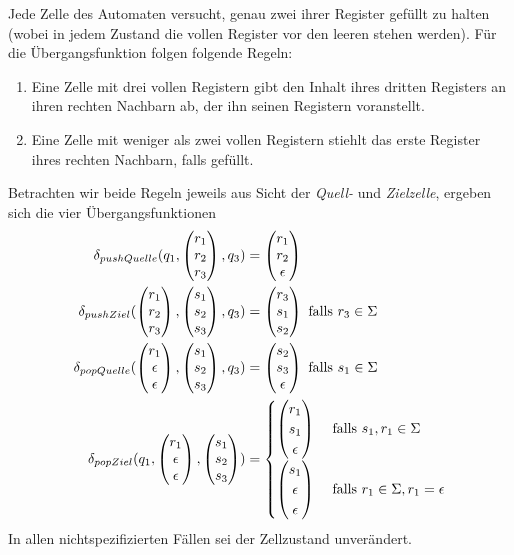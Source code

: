 \documentclass{article}
\begin{document}
Jede Zelle des Automaten versucht, genau zwei ihrer Register gefüllt zu halten (wobei in jedem Zustand die vollen Register vor den leeren stehen werden). Für die Übergangsfunktion folgen folgende Regeln:
\begin{enumerate}
    \item Eine Zelle mit drei vollen Registern gibt den Inhalt ihres dritten Registers an ihren rechten Nachbarn ab, der ihn seinen Registern voranstellt.
    \item Eine Zelle mit weniger als zwei vollen Registern stiehlt das erste Register ihres rechten Nachbarn, falls gefüllt.
\end{enumerate}

Betrachten wir beide Regeln jeweils aus Sicht der \emph{Quell-} und \emph{Zielzelle}, ergeben sich die vier Übergangsfunktionen
\begin{align*}
    \delta_{pushQuelle}(q_1,\begin{pmatrix}r_1\\r_2\\r_3\end{pmatrix},q_3) &= \begin{pmatrix}r_1\\r_2\\\epsilon\end{pmatrix} \\
    \delta_{pushZiel}(\begin{pmatrix}r_1\\r_2\\r_3\end{pmatrix},\begin{pmatrix}s_1\\s_2\\s_3\end{pmatrix},q_3) &= \begin{pmatrix}r_3\\s_1\\s_2\end{pmatrix} \text{ falls } r_3 \in \Sigma \\
    \delta_{popQuelle}(\begin{pmatrix}r_1\\\epsilon\\\epsilon\end{pmatrix},\begin{pmatrix}s_1\\s_2\\s_3\end{pmatrix},q_3) &= \begin{pmatrix}s_2\\s_3\\\epsilon\end{pmatrix} \text { falls } s_1 \in \Sigma \\
    \delta_{popZiel}(q_1,\begin{pmatrix}r_1\\\epsilon\\\epsilon\end{pmatrix},\begin{pmatrix}s_1\\s_2\\s_3\end{pmatrix}) &= \begin{cases}
        \begin{pmatrix}r_1\\s_1\\\epsilon\end{pmatrix} &\text { falls } s_1,r_1 \in \Sigma \\
        \begin{pmatrix}s_1\\\epsilon\\\epsilon\end{pmatrix} &\text { falls } r_1 \in \Sigma, r_1 = \epsilon
    \end{cases}
\end{align*}
In allen nichtspezifizierten Fällen sei der Zellzustand unverändert.
\end{document}
